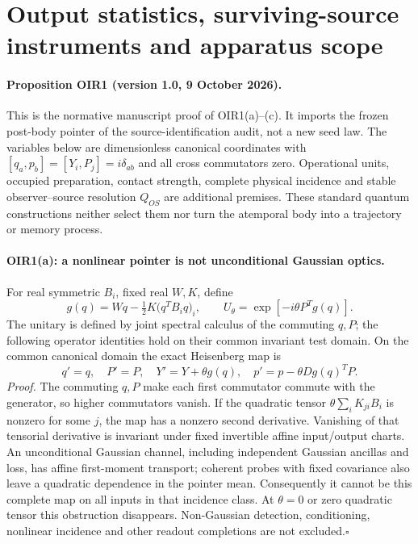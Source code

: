 \documentclass[11pt]{article}
\begin{document}
\section{Output statistics, surviving-source instruments and apparatus scope}
\label{sec:oir1}\hypertarget{oir1}{}
\paragraph{Proposition OIR1 (version 1.0, 9 October 2026).}
\label{prop:oir1}
This is the normative manuscript proof of OIR1(a)--(c). It imports the frozen
post-body pointer of the source-identification audit, not a new seed law.
The variables below are dimensionless canonical coordinates with
$[q_a,p_b]=[Y_i,P_j]=i\delta_{ab}$ and all cross commutators zero.
Operational units, occupied preparation, contact strength, complete physical
incidence and stable observer--source resolution $Q_{OS}$ are additional
premises. These standard quantum constructions neither select them nor turn
the atemporal body into a trajectory or memory process.

\paragraph{OIR1(a): a nonlinear pointer is not unconditional Gaussian optics.}
For real symmetric $B_i$, fixed real $W,K$, define
\[
 g(q)=Wq-\tfrac12K\bigl(q^TB_iq\bigr)_i,
 \qquad U_\theta=\exp[-i\theta P^Tg(q)].
\]
The unitary is defined by joint spectral calculus of the commuting $q,P$;
the following operator identities hold on their common invariant test domain.
On the common canonical domain the exact Heisenberg map is
\[
 q'=q,\quad P'=P,\quad Y'=Y+\theta g(q),\quad
 p'=p-\theta Dg(q)^TP.                                      \tag{OIR1a}
\]
\emph{Proof.} The commuting $q,P$ make each first commutator commute
with the generator, so higher commutators vanish. If the quadratic tensor
$\theta\sum_i K_{ji}B_i$ is nonzero for some $j$, the map has a nonzero
second derivative. Vanishing of that tensorial derivative is invariant
under fixed invertible affine input/output charts. An unconditional Gaussian
channel, including independent Gaussian ancillas and loss, has affine
first-moment transport; coherent probes with fixed covariance also leave a
quadratic dependence in the pointer mean. Consequently it cannot be this
complete map on all inputs in that incidence class. At $\theta=0$ or zero
quadratic tensor this obstruction disappears. Non-Gaussian detection,
conditioning, nonlinear incidence and other readout completions are not
excluded.\hfill$\square$
\end{document}
